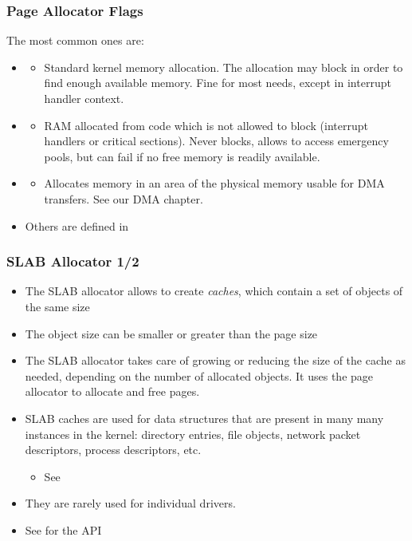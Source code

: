 \begin{frame}
  \frametitle{Page Allocator Flags}
  The most common ones are:
  \begin{itemize}
  \item {}
    \begin{itemize}
    \item Standard kernel memory allocation. The allocation may
      block in order to find enough available memory. Fine for most
      needs, except in interrupt handler context.
    \end{itemize}
  \item {}
    \begin{itemize}
    \item RAM allocated from code which is not allowed to block
      (interrupt handlers or critical sections). Never blocks,
      allows to access emergency pools, but can fail if no free
      memory is readily available.
    \end{itemize}
  \item {}
    \begin{itemize}
    \item Allocates memory in an area of the physical memory usable
      for DMA transfers. See our DMA chapter.
    \end{itemize}
  \item Others are defined in 
  \end{itemize}
\end{frame}

\begin{frame}
  \frametitle{SLAB Allocator 1/2}
  \begin{itemize}
  \item The SLAB allocator allows to create {\em caches}, which contain a
    set of objects of the same size
  \item The object size can be smaller or greater than the page size
  \item The SLAB allocator takes care of growing or reducing the size
    of the cache as needed, depending on the number of allocated
    objects. It uses the page allocator to allocate and free pages.
  \item SLAB caches are used for data structures that are present in
    many many instances in the kernel: directory entries, file
    objects, network packet descriptors, process descriptors, etc.
    \begin{itemize}
    \item See 
    \end{itemize}
  \item They are rarely used for individual drivers.
  \item See  for the API
\end{itemize}
\end{frame}

